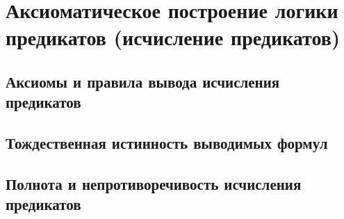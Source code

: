 \section{Аксиоматическое построение логики предикатов (исчисление предикатов)}
\subsection{Аксиомы и правила вывода исчисления предикатов}
\subsection{Тождественная истинность выводимых формул}
\subsection{Полнота и непротиворечивость исчисления предикатов}
